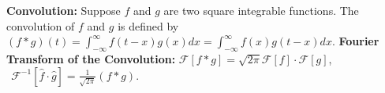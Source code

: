 {\bf Convolution:} Suppose $f$ and $g$ are two square integrable functions. The convolution of $f$ and $g$ is defined by $(f*g)(t)=\int_{-\infty}^{\infty}f(t-x)g(x)dx=\int_{-\infty}^{\infty}f(x)g(t-x)dx$. 
{\bf Fourier Transform of the Convolution:} \newline$\mathcal{F}[f*g]=\sqrt{2\pi}\mathcal{F}[f]\cdot\mathcal{F}[g]$,   $~~\mathcal{F}^{-1}[\hat{f}\cdot\hat{g}]=\frac{1}{\sqrt{2\pi}}(f*g)$.